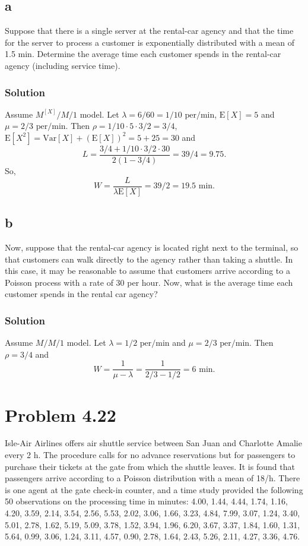 \documentclass[letterpaper]{amsart}
\begin{document}
\subsection*{a}
Suppose that there is a single server at the rental-car agency and that the
time for the server to process a customer is exponentially distributed
with a mean of 1.5 min. Determine the average time each customer
spends in the rental-car agency (including service time).
\subsubsection*{Solution}
Assume $M^{[X]}/M/1$ model.
Let $\lambda = 6/60 = 1/10 \text{ per/min}$, $\text{E}[X] = 5$ and $\mu=2/3\text{ per/min}$.
Then $\rho = 1/10\cdot 5 \cdot 3/2 =3/4$, $\text{E}[X^2] = \text{Var}[X] +
(\text{E}[X])^2=5 + 25 = 30$ and
\begin{equation*}
  L = \frac{3/4+1/10\cdot 3/2\cdot 30}{2(1-3/4)} = 39/4 = 9.75.
\end{equation*}
So,
\begin{equation*}
  W = \frac{L}{\lambda\text{E}[X]}=39/2 = 19.5 \text{ min}.
\end{equation*}
\subsection*{b}
Now, suppose that the rental-car agency is located right next to the
terminal, so that customers can walk directly to the agency rather than
taking a shuttle. In this case, it may be reasonable to assume that
customers arrive according to a Poisson process with a rate of 30 per
hour. Now, what is the average time each customer spends in the rental
car agency?
\subsubsection*{Solution}
Assume $M/M/1$ model.
Let $\lambda = 1/2\text{ per/min}$ and $\mu = 2/3\text{ per/min}$.
Then $\rho = 3/4$ and
\begin{equation*}
  W = \frac{1}{\mu - \lambda} =\frac{1}{2/3 - 1/2}= 6\text{ min}.
\end{equation*}

\section{Problem 4.22} %
Isle-Air Airlines offers air shuttle service between San Juan and Charlotte
Amalie every 2 h. The procedure calls for no advance reservations but
for passengers to purchase their tickets at the gate from which the shuttle
leaves. It is found that passengers arrive according to a Poisson distribution
with a mean of 18/h. There is one agent at the gate check-in counter, and
a time study provided the following 50 observations on the processing time
in minutes: 4.00, 1.44, 4.44, 1.74, 1.16, 4.20, 3.59, 2.14, 3.54, 2.56, 5.53, 2.02, 3.06,
1.66, 3.23, 4.84, 7.99, 3.07, 1.24, 3.40, 5.01, 2.78, 1.62, 5.19, 5.09, 3.78,
1.52, 3.94, 1.96, 6.20, 3.67, 3.37, 1.84, 1.60, 1.31, 5.64, 0.99, 3.06, 1.24,
3.11, 4.57, 0.90, 2.78, 1.64, 2.43, 5.26, 2.11, 4.27, 3.36, 4.76.
\end{document}
